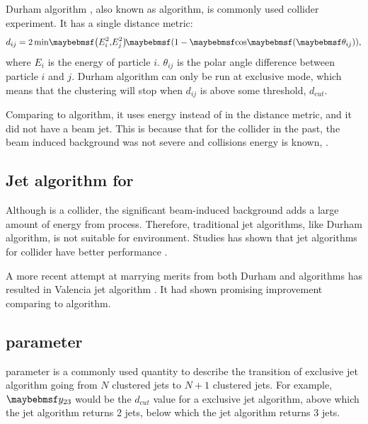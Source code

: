 Durham algorithm \cite{Catani:1991hj}, also known as \ee \kt algorithm, is commonly used \ee collider experiment. It has a single distance metric:
\begin{equation}
d_{ij} = 2\min\!\parenths{E_i^2,\!E_j^2}\!\parenths{1 - \cosOf{\theta_{ij}}},
\end{equation}
where $E_i$ is the energy of particle $i$. $\theta_{ij}$ is the polar angle difference between particle $i$ and $j$. Durham algorithm can only be run at exclusive mode, which means that the clustering will stop when $d_{ij}$ is above some threshold, $d_{cut}$.

Comparing to \kt algorithm, it uses energy instead of \pT in the distance metric, and it did not have a beam jet. This is because that for the \ee collider in the past, the beam induced background was not severe and collisions energy is known, \sqrtS.

\subsection{Jet algorithm for \CLIC}

Although \CLIC is a \ee collider, the significant beam-induced background adds a large amount of energy from \ggHad process. Therefore, traditional \ee jet algorithms, like Durham algorithm, is not suitable for \CLIC environment. Studies has shown that jet algorithms for \pp collider have better performance \cite{Linssen:2012hp,LCD-Note-2010-006}.

A more recent attempt at marrying merits from both Durham and \kt algorithms has resulted in Valencia jet algorithm \cite{Boronat:2014hva}. It had shown promising improvement comparing to \kt algorithm.

\subsection{\y{} parameter}
\y{} parameter is a commonly used quantity to describe the transition of exclusive jet algorithm going from $N$ clustered jets to $N\!+\!1$ clustered jets. For example, $\y{23}$ would be the $d_{cut}$ value for a exclusive jet algorithm, above which the jet algorithm returns 2 jets, below which the jet algorithm returns 3 jets.

